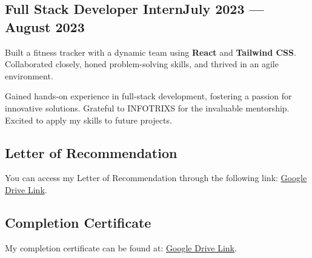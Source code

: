 \subsection{{Full Stack Developer Intern\hfill July 2023 --- August 2023}}
\begin{zitemize}
    \item Built a fitness tracker with a dynamic team using \textbf{React} and \textbf{Tailwind CSS}. Collaborated closely, honed problem-solving skills, and thrived in an agile environment. 
    \item Gained hands-on experience in full-stack development, fostering a passion for innovative solutions. Grateful to INFOTRIXS for the invaluable mentorship. Excited to apply my skills to future projects.
\end{zitemize}
\begin{zitemize}
\subsection{{Letter of Recommendation}}
\item You can access my Letter of Recommendation through the following link: \href{https://drive.google.com/file/d/1CgP45vZIpdOrJJdlWFLo5sY55WQj5FiL/view?usp=drivesdk}{Google Drive Link}.
\end{zitemize}
\begin{zitemize}
\subsection{{Completion Certificate}}
\item My completion certificate can be found at: \href{https://drive.google.com/file/d/1DF9omNonCkAQRWrWYLqhWcF5RD2DxaC6/view?usp=drivesdk}{Google Drive Link}.
\end{zitemize}

